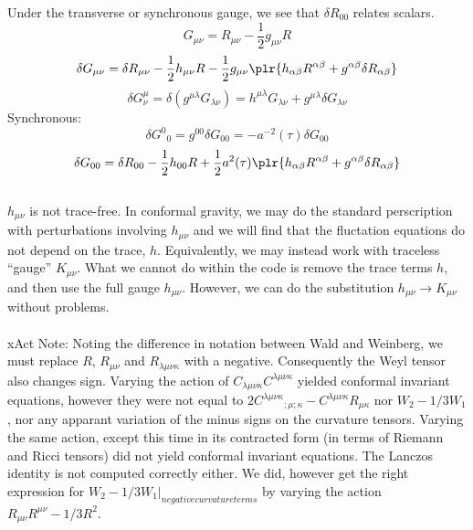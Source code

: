 \documentclass[10pt,letterpaper]{article}
\begin{document}
\ea
Under the transverse or synchronous gauge, we see that $\delta R_{00}$ relates scalars. 
\[
	G_{\mu\nu} = R_{\mu\nu} - \frac12 g_{\mu\nu}R
\]
\[
	\delta G_{\mu\nu} = \delta R_{\mu\nu} - \frac12 h_{\mu\nu}R - \frac12 g_{\mu\nu}\plr{
	h_{\alpha\beta}R^{\alpha\beta} + g^{\alpha\beta}\delta R_{\alpha\beta}}
\]
\[
	\delta G^{\mu}_{\nu} = \delta( g^{\mu\lambda}G_{\lambda\nu}) = h^{\mu\lambda}G_{\lambda\nu}
	+ g^{\mu\lambda}\delta G_{\lambda\nu}
\]
Synchronous:
\[
	\delta G^0{}_0 = g^{00}\delta G_{00} = -a^{-2}(\tau)\delta G_{00}
\]
\[	
	\delta G_{00} = \delta R_{00} - \frac12 h_{00}R + \frac12 a^2(\tau)\plr{ h_{\alpha\beta}R^{\alpha\beta}
	+g^{\alpha\beta}\delta R_{\alpha\beta}}
\]
\\
$h_{\mu\nu}$ is not trace-free. In conformal gravity, we may do the standard perscription with perturbations involving $h_{\mu\nu}$ and we will find that the fluctation equations do not depend on the trace, $h$. Equivalently, we may instead work with traceless ``gauge'' $K_{\mu\nu}$. What we cannot do within the code is remove the trace terms $h$, and then use the full gauge $h_{\mu\nu}$. However, we can do the substitution $h_{\mu\nu} \to K_{\mu\nu}$ without problems. \\ \\
xAct Note: Noting the difference in notation between Wald and Weinberg, we must replace $R$, $R_{\mu\nu}$ and $R_{\lambda\mu\nu\kappa}$ with a negative. Consequently the Weyl tensor also changes sign. Varying the action of $C_{\lambda\mu\nu\kappa}C^{\lambda\mu\nu\kappa}$ yielded conformal invariant equations, however they were not equal to $2C^{\lambda\mu\nu\kappa}{}_{;\mu;\kappa} - C^{\lambda\mu\nu\kappa}R_{\mu\kappa}$ nor $W_2 - 1/3 W_1$, nor any apparant variation of the minus signs on the curvature tensors. Varying the same action, except this time in its contracted form (in terms of Riemann and Ricci tensors) did not yield conformal invariant equations. The Lanczos identity is not computed correctly either. We did, however get the right expression for $W_2 -1/3W_1|_{negative curvature terms}$ by varying the action $R_{\mu\nu}R^{\mu\nu} - 1/3R^2$. 
\\ \\ \\
\end{document}
